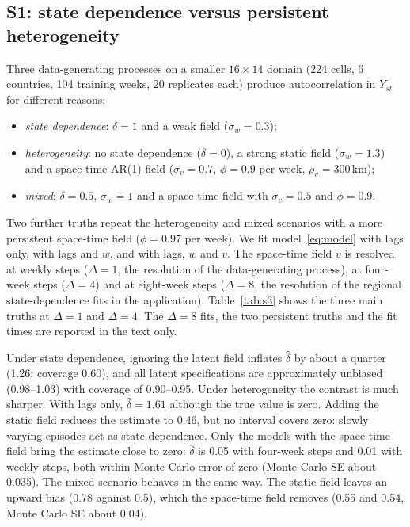 \begin{table}
\caption{S0: accuracy of the finite-volume SPDE field and of the empirical Bayes
Laplace approximation, with fields drawn from the continuous Mat\'ern process (50
replicates per setting). Mean over replicates, with the SD across replicates in
parentheses, except for the coverage of $b_1$, where it is the Monte Carlo standard
error.}\label{tab:s0}
\centering\small

\end{table}

\subsection{S1: state dependence versus persistent heterogeneity}\label{sec:sim-persistence}

Three data-generating processes on a smaller $16 \times 14$ domain (224 cells, 6
countries, 104 training weeks, 20 replicates each) produce autocorrelation in $Y_{st}$
for different reasons:
\begin{itemize}
\item \emph{state dependence}: $\delta = 1$ and a weak field ($\sigma_w = 0.3$);
\item \emph{heterogeneity}: no state dependence ($\delta = 0$), a strong static field
($\sigma_w = 1.3$) and a space-time AR(1) field ($\sigma_v = 0.7$, $\phi = 0.9$ per
week, $\rho_v = 300$\,km);
\item \emph{mixed}: $\delta = 0.5$, $\sigma_w = 1$ and a space-time field with
$\sigma_v = 0.5$ and $\phi = 0.9$.
\end{itemize}
Two further truths repeat the heterogeneity and mixed scenarios with a more persistent
space-time field ($\phi = 0.97$ per week). We fit model~\eqref{eq:model} with lags only,
with lags and $w$, and with lags, $w$ and $v$. The space-time field $v$ is resolved at
weekly steps ($\Delta = 1$, the resolution of the data-generating process), at four-week
steps ($\Delta = 4$) and at eight-week steps ($\Delta = 8$, the resolution of the
regional state-dependence fits in the application). Table~\ref{tab:s3} shows the three
main truths at $\Delta = 1$ and $\Delta = 4$. The $\Delta = 8$ fits, the two
persistent truths and the fit times are reported in the text only.

Under state dependence, ignoring the latent field inflates $\hat\delta$ by about a
quarter (1.26; coverage 0.60), and all latent specifications are approximately unbiased
(0.98--1.03) with coverage of 0.90--0.95. Under heterogeneity the contrast is much
sharper. With lags only, $\hat\delta = 1.61$ although the true value is zero. Adding the
static field reduces the estimate to 0.46, but no interval covers zero: slowly varying
episodes act as state dependence. Only the models with the space-time field bring the
estimate close to zero: $\hat\delta$ is 0.05 with four-week steps and 0.01 with weekly
steps, both within Monte Carlo error of zero (Monte Carlo SE about 0.035). The mixed
scenario behaves in the same way. The static field leaves an upward bias (0.78 against
0.5), which the space-time field removes (0.55 and 0.54, Monte Carlo SE about 0.04).

